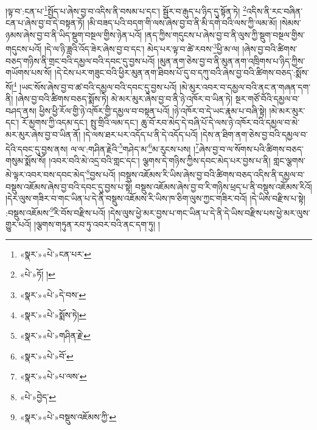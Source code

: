 །ལྟ་བ་:ངན་པ་\footnote{«སྣར་»«པེ་»ངན་པར་}སྤྱོད་པ་ཞེས་བྱ་བ་འདིས་ནི་བསམ་པ་དང་། སྦྱོར་བ་རྒུད་པ་ཉིད་དུ་སྟོན་ཏེ། \footnote{«པེ་»ཏོ། ། }འདིས་ནི་རང་བཞིན་ངན་པ་ཞེས་བྱ་བ་དེ་བསྟན་ཏོ། །མི་བཟད་པའི་བདག་གི་ལས་ཞེས་བྱ་བ་ནི་མི་དགེ་བའི་ལས་ཀྱི་ལམ་མོ། །སེམས་ཉམས་ཞེས་བྱ་བ་ནི་ཡིད་སྡུག་བསྔལ་གྱིས་ཉེན་པའོ། །ནད་ཀྱིས་གདུངས་པ་ཞེས་བྱ་བ་ནི་ལུས་ཀྱི་སྡུག་བསྔལ་གྱིས་གདུངས་པའོ། །དེ་ལ་ཉི་ཟླའི་འོད་ཟེར་ཞེས་བྱ་བ་དང་། མེད་པར་ལྟ་བ་ཚེ་རབས་\footnote{«སྣར་»«པེ་»དེ་བས་}ཕྱི་མ་ལ། །ཞེས་བྱ་བའི་ཚིགས་བཅད་གཉིས་ནི་གྲང་བའི་དམྱལ་བའི་དབང་དུ་བྱས་པའོ། །མུན་ནག་ཅེས་བྱ་བ་ནི་མུན་ནག་འཁྲིགས་པ་ཉིད་ཀྱིས་གཡོགས་པས་སོ། །དེ་ངེས་པར་གཟུང་བའི་ཕྱིར་མུན་ནག་ཐིབས་པོ་དུ་བ་དཀུ་བའི་ཞེས་བྱ་བའི་ཚིགས་བཅད་:སྨོས་སོ།\footnote{«སྣར་»«པེ་»སྨོས་ཏེ།} །ཡང་སོས་ཞེས་བྱ་བ་ཚ་བའི་དམྱལ་བའི་དབང་དུ་བྱས་པའོ། །མེ་མུར་འབར་བ་དམྱལ་བའི་ནང་ན་གཞན་དག་ནི། །ཞེས་བྱ་བའི་ཚིགས་བཅད་སྨོས་ཏེ། མེ་མར་མུར་ཞེས་བྱ་བ་ནི་ཉེ་འཁོར་བ་ཡིན་ཏེ། སྔར་གཙོ་བོའི་དམྱལ་བ་བཤད་ནས། ཕྱིས་ཕྱི་རོལ་གྱི་ཉེ་འཁོར་གྱི་དམྱལ་བ་བསྟན་པའོ། །ཉེ་འཁོར་བ་དེ་ཡང་རྣམ་པ་བཞི་སྟེ། །མེ་མར་མུར་དང་། རོ་མྱགས་ཀྱི་འདམ་དང་། སྤུ་གྲིའི་ལམ་དང་། ཆུ་བོ་རབ་མེད་དེ་བཞི་པོ་དེ་ལས་ཉེ་འཁོར་བའི་དམྱལ་བ་མེ་མར་མུར་ཞེས་བྱ་བ་ཡིན་ནོ། །དེ་ལས་ཐར་པར་འདོད་པ་ནི་དེ་འདོད་པའོ། །དེས་ན་ཐིག་ནག་ཅེས་བྱ་བའི་དམྱལ་བ་དེའི་དབང་དུ་བྱས་ནས། ལ་ལ་:གཤིན་རྗེའི་\footnote{«སྣར་»«པེ་»གཤིན་རྗེ་}གཤེད་མ་\footnote{«སྣར་»«པེ་»བོ་}མ་རུངས་པས། །\footnote{«སྣར་»«པེ་»པ་ལས་}ཞེས་བྱ་བ་ལ་སོགས་པའི་ཚིགས་བཅད་གསུམ་སྨོས་སོ། །འབར་བའི་མེ་འདྲ་བའི་གླང་དང་། ལྕགས་དེ་གཉིས་ཀྱིས་དབང་མེད་པར་བྱས་པ་ནི། གླང་ལྕགས་མེ་ལྟར་འབར་བས་དབང་མེད་\footnote{«པེ་»བྱེད་}བྱས་པའོ། །བསྡུས་འཇོམས་རི་ཡིས་ཞེས་བྱ་བའི་ཚིགས་བཅད་འདིས་ནི་དམྱལ་བ་བསྡུས་འཇོམས་ཞེས་བྱ་བའི་དབང་དུ་བྱས་པ་སྟེ། བསྡུས་འཇོམས་ཞེས་བྱ་བ་རི་གཉིས་ཕྲད་པ་ནི་བསྡུས་འཇོམས་རིའོ། །དེར་ལུས་གཟིར་བ་གང་ཡིན་པ་དེ་ནི་བསྡུས་འཇོམས་རི་ཡིས་ཁ་ཅིག་ལུས་ཀྱང་གཟིར་བའོ། །དེ་ཡིས་བརྫིས་པ་སྟེ། :བསྡུས་འཇོམས་\footnote{«སྣར་»«པེ་»བསྡུས་འཇོམས་ཀྱི་}རི་བོས་བརྫིས་པའོ། །དེས་ལུས་ཕྱེ་མར་བྱས་པ་གང་ཡིན་པ་དེ་ནི་དེ་ཡིས་བརྫིས་པས་ཕྱེ་མར་ལུས་གྱུར་པའོ། །ལྕགས་གཏུན་རབ་ཏུ་འབར་བའི་ནང་དག་ཏུ། །
